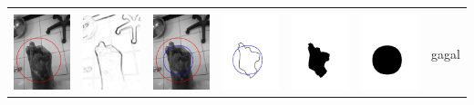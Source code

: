 \begin{table}[H]
\begin{tabular}{|m{0.7in}|m{0.7in}|m{0.7in}|m{0.7in}|m{0.7in}|m{0.7in}|m{0.7in}|}
		&  &  & & & &  \\
		\includegraphics[width=0.7in]{dataset/dataset_3/luka_merah/ready/4_integer_init.jpg}&
		\includegraphics[width=0.7in]{dataset/dataset_3/luka_merah/ready/4_integer_ext.jpg}&
		\includegraphics[width=0.7in]{dataset/dataset_3/luka_merah/ready/4_integer_result.jpg}&
		\includegraphics[width=0.7in]{dataset/dataset_3/luka_merah/ready/4_gt_r_integer.jpg}&
		\includegraphics[width=0.7in]{dataset/dataset_3/luka_merah/ready/4_r.jpg}&
		\includegraphics[width=0.7in]{dataset/dataset_3/luka_merah/ready/4_integer_r.jpg}&
		gagal\\
		\hline
		

\end{tabular}
\end{table}

